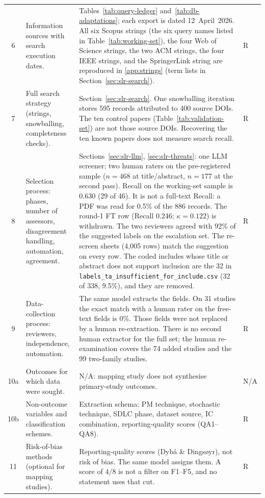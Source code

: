 \begin{longtable}{c p{4.4cm} p{6.6cm} l}
6 & Information sources with search execution dates. & Tables~\ref{tab:query-ledger} and~\ref{tab:db-adaptations}; each export is dated 12~April~2026. All six Scopus strings (the six query names listed in Table~\ref{tab:working-set}), the four Web of Science strings, the two ACM strings, the four IEEE strings, and the SpringerLink string are reproduced in \ref{app:strings} (term lists in Section~\ref{sec:slr-search}). & R \\
7 & Full search strategy (strings, snowballing, completeness checks). & Section~\ref{sec:slr-search}. One snowballing iteration stores 595 records attributed to 400 source DOIs. The ten control papers (Table~\ref{tab:validation-set}) are not those source DOIs. Recovering the ten known papers does not measure search recall. & R \\
8 & Selection process: phases, number of assessors, disagreement handling, automation, agreement. & Sections~\ref{sec:slr-llm}, \ref{sec:slr-threats}: one LLM screener; two human raters on the pre-registered sample ($n=468$ at title/abstract, $n=177$ at the second pass). Recall on the working-set sample is 0.630 (29 of 46). It is not a full-text Recall: a PDF was read for 0.5\% of the 886 records. The round-1 FT row (Recall 0.246; $\kappa = 0.122$) is withdrawn. The two reviewers agreed with 92\% of the suggested labels on the escalation set. The re-screen sheets (4{,}005 rows) match the suggestion on every row. The coded includes whose title or abstract does not support inclusion are the 32 in \texttt{labels\_ta\_insufficient\_\allowbreak for\_include.csv} (32 of 338, 9.5\%), and they are removed. & R \\
9 & Data-collection process: reviewers, independence, automation. & The same model extracts the fields. On 31 studies the exact match with a human rater on the free-text fields is 0\%. Those fields were not replaced by a human re-extraction. There is no second human extractor for the full set; the human re-examination covers the 74 added studies and the 99 two-family studies. & R \\
10a & Outcomes for which data were sought. & N/A: mapping study does not synthesise primary-study outcomes. & N/A \\
10b & Non-outcome variables and classification schemes. & Extraction schema: PM technique, stochastic technique, SDLC phase, dataset source, IC combination, reporting-quality scores (QA1--QA8). & R \\
11 & Risk-of-bias methods (optional for mapping studies). & Reporting-quality scores (Dyb{\aa} \& Dings{\o}yr), not risk of bias. The same model assigns them. A score of $4/8$ is not a filter on F1--F5, and no statement uses that cut. & R \\

\end{longtable}
